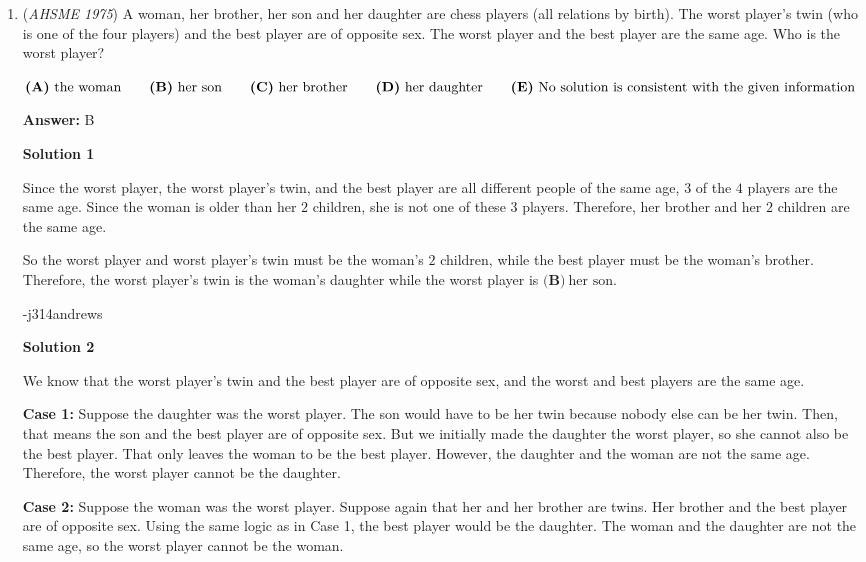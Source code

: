 \begin{enumerate}
 


	\item (\textit{AHSME 1975}) A woman, her brother, her son and her daughter are chess players (all relations by birth). The worst player's twin (who is one of the four players) and the best player are of opposite sex. The worst player and the best player are the same age. Who is the worst player?


 $\textbf{(A)}\ \text{the woman} \qquad \textbf{(B)}\ \text{her son} \qquad \textbf{(C)}\ \text{her brother} \qquad \textbf{(D)}\ \text{her daughter}\\ \qquad \textbf{(E)}\ \text{No solution is consistent with the given information}$

 \textbf{Answer: }B



\textbf{Solution 1}

Since the worst player, the worst player's twin, and the best player are all different people of the same age, $3$ of the $4$ players are the same age.  Since the woman is older than her $2$ children, she is not one of these $3$ players.  Therefore, her brother and her $2$ children are the same age.

 So the worst player and worst player's twin must be the woman's $2$ children, while the best player must be the woman's brother.  Therefore, the worst player's twin is the woman's daughter while the worst player is $\boxed{\textbf{(B)}\ \text{her son}}$.

 -j314andrews

 



\textbf{Solution 2}

We know that the worst player's twin and the best player are of opposite sex, and the worst and best players are the same age.

 \textbf{Case 1:} Suppose the daughter was the worst player. The son would have to be her twin because nobody else can be her twin. Then, that means the son and the best player are of opposite sex. But we initially made the daughter the worst player, so she cannot also be the best player. That only leaves the woman to be the best player. However, the daughter and the woman are not the same age. Therefore, the worst player cannot be the daughter.

 \textbf{Case 2:} Suppose the woman was the worst player. Suppose again that her and her brother are twins. Her brother and the best player are of opposite sex. Using the same logic as in Case 1, the best player would be the daughter. The woman and the daughter are not the same age, so the worst player cannot be the woman.


\end{enumerate}
